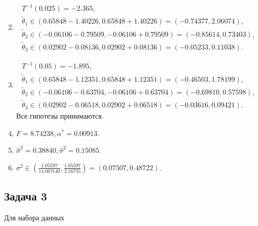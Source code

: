 \documentclass[a4paper,12pt]{article}
\begin{document}
\begin{enumerate}
\begin{gather*}
              \end{gather*}
        \item
              \begin{gather*}
                  T^{-1}(0.025) = -2.365, \\
                  \widetilde{\theta}_1 \in (0.65848 - 1.40226, 0.65848 + 1.40226) = (-0.74377, 2.06074) , \\
                  \widetilde{\theta}_2 \in (-0.06106 - 0.79509, -0.06106 + 0.79509) = (-0.85614, 0.73403) , \\
                  \widetilde{\theta}_3 \in (0.02902 - 0.08136, 0.02902 + 0.08136) = (-0.05233, 0.11038) .
              \end{gather*}

        \item
              \begin{gather*}
                  T^{-1}(0.05) = -1.895, \\
                  \widetilde{\theta}_1 \in (0.65848 - 1.12351, 0.65848 + 1.12351) = (-0.46503, 1.78199) , \\
                  \widetilde{\theta}_2 \in (-0.06106 - 0.63704, -0.06106 + 0.63704) = (-0.69810, 0.57598) , \\
                  \widetilde{\theta}_3 \in (0.02902 - 0.06518, 0.02902 + 0.06518) = (-0.03616, 0.09421) .
              \end{gather*}
              Все гипотезы принимаются.

        \item $F = 8.74238, \alpha^* = 0.00913$.

        \item $\widehat{\sigma}^2 = 0.38840 , \widehat{\sigma}^2 = 0.15085$.

        \item $\sigma^2 \in \left( \frac{1.05597}{14.067140}, \frac{1.05597}{2.16735} \right ) = (0.07507, 0.48722)$.
    \end{enumerate}
\fi

\subsection*{Задача 3}

Для набора данных
\end{document}
